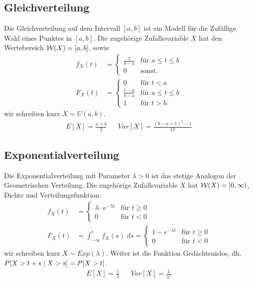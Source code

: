 \subsection*{Gleichverteilung}
Die Gleichverteilung auf dem Intervall $[a, b]$ ist ein Modell für die
Zufällige Wahl eines Punktes in $[a, b]$. Die zugehörige Zufallsvariable $X$
hat den Wertebereich $\mathcal{W} (X) = [a, b]$, sowie
\begin{align*}
  f_X (t) & =
  \begin{cases}
    \frac{1}{b-a} & \text{für } a \leq t \leq b \\
    0             & \text{sonst.}
  \end{cases} \\
  F_X (t) & =
  \begin{cases}
    0               & \text{für } t < a           \\
    \frac{t-a}{b-a} & \text{für } a \leq t \leq b \\
    1               & \text{für } t > b.
  \end{cases}
\end{align*}
wir schreiben kurz $X \sim U (a, b)$.
\begin{align*}
  E[X] = \frac{a + b}{2} &  & Var[X] = \frac{ (b - a + 1)^2 - 1}{12}
\end{align*}
\subsection*{Exponentialverteilung}
Die Exponentialverteilung mit Parameter $\lambda > 0$ ist das stetige Analogon
der Geometrischen Verteilung. Die zugehörige Zufallsvariable $X$ hat $\mathcal{W} (X) =
  [0, \infty)$, Dichte und Verteilungsfunktion:
\begin{align*}
  f_X (t) & =
  \begin{cases}
    \lambda \cdot e^{-\lambda t} & \text{für } t \geq 0 \\
    0                            & \text{für }t < 0
  \end{cases} \\
  F_X (t) & =
  \int_{-\infty}^t f_X (s) \; ds =
  \begin{cases}
    1 - e^{-\lambda t} & \text{für } t \geq 0 \\
    0                  & \text{für }t < 0
  \end{cases}
\end{align*}
wir schreiben kurz $X \sim Exp (\lambda)$. Weiter ist
die Funktion Gedächtsnislos, dh. $P[X > t + s \; | \; X > s] = P[X > t]$.
\begin{align*}
  E[X] = \frac{1}{\lambda} &  & Var[X] = \frac{1}{\lambda^2}
\end{align*}
